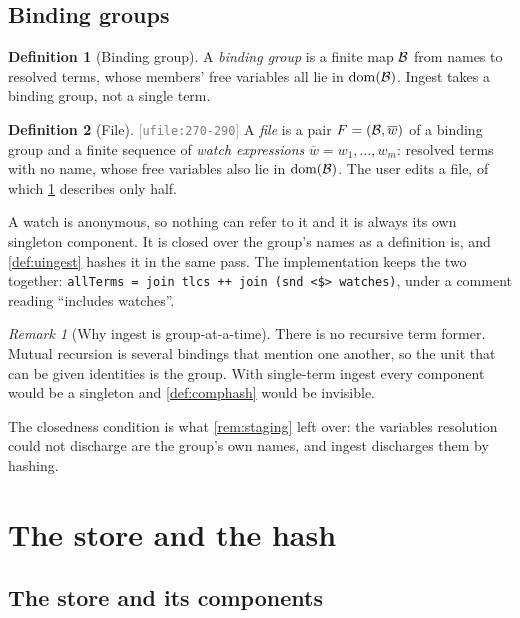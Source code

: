\documentclass[11pt]{article}
\theoremstyle{definition}
\newtheorem{definition}{Definition}[section]
\theoremstyle{plain}
\theoremstyle{remark}
\newtheorem{remark}{Remark}[section]
\newcommand{\src}[1]{{\footnotesize\textcolor{gray}{[\texttt{#1}]}}}
\begin{document}
\subsection{Binding groups}

\begin{definition}[Binding group]\label{def:bindgroup}
A \emph{binding group} is a finite map $\mathcal{B}$ from names to resolved terms, whose members' free
variables all lie in $\operatorname{dom}(\mathcal{B})$. Ingest takes a binding group, not a single term.
\end{definition}

\begin{definition}[File]\label{def:ufile}
\src{ufile:270-290} A \emph{file} is a pair $F = (\mathcal{B}, \overline{w})$ of a binding group and a
finite sequence of \emph{watch expressions} $\overline{w} = w_1,\dots,w_m$: resolved terms with no
name, whose free variables also lie in $\operatorname{dom}(\mathcal{B})$. The user edits a file, of which
\cref{def:bindgroup} describes only half.

A watch is anonymous, so nothing can refer to it and it is always its own singleton component. It is
closed over the group's names as a definition is, and \cref{def:uingest} hashes it in the same pass.
The implementation keeps the two together: \texttt{allTerms = join tlcs ++ join (snd <\$> watches)},
under a comment reading ``includes watches''.
\end{definition}

\begin{remark}[Why ingest is group-at-a-time]\label{rem:mutrec}
There is no recursive term former. Mutual recursion is several bindings that mention one another, so
the unit that can be given identities is the group. With single-term ingest every component would be
a singleton and \cref{def:comphash} would be invisible.

The closedness condition is what \cref{rem:staging} left over: the variables resolution could not
discharge are the group's own names, and ingest discharges them by hashing.
\end{remark}

\section{The store and the hash}\label{sec:ustore}

\subsection{The store and its components}
\end{document}

